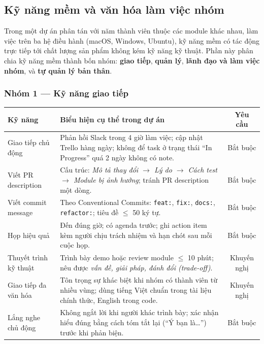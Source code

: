 \documentclass[12pt,a4paper]{article}
\begin{document}
\subsection{Kỹ năng mềm và văn hóa làm việc nhóm}

Trong một dự án phân tán với năm thành viên thuộc các module khác nhau, làm việc
trên ba hệ điều hành (macOS, Windows, Ubuntu), kỹ năng mềm có tác động trực tiếp
tới chất lượng sản phẩm không kém kỹ năng kỹ thuật. Phần này phân chia kỹ năng
mềm thành bốn nhóm: \textbf{giao tiếp}, \textbf{quản lý}, \textbf{lãnh đạo và
làm việc nhóm}, và \textbf{tự quản lý bản thân}.

\subsubsection{Nhóm 1 --- Kỹ năng giao tiếp}

\begin{tabularx}{\linewidth}{|l|X|c|}
\hline
\rowcolor{gray!20}
\textbf{Kỹ năng} & \textbf{Biểu hiện cụ thể trong dự án} & \textbf{Yêu cầu} \\
\hline
Giao tiếp chủ động & Phản hồi Slack trong 4 giờ làm việc; cập nhật Trello hàng ngày;
                     không để task ở trạng thái ``In Progress'' quá 2 ngày không có note. & Bắt buộc \\
\hline
Viết PR description & Cấu trúc: \textit{Mô tả thay đổi $\to$ Lý do $\to$ Cách test $\to$
                      Module bị ảnh hưởng}; tránh PR description một dòng. & Bắt buộc \\
\hline
Viết commit message & Theo Conventional Commits: \texttt{feat:}, \texttt{fix:},
                      \texttt{docs:}, \texttt{refactor:}; tiêu đề $\le$ 50 ký tự. & Bắt buộc \\
\hline
Họp hiệu quả & Đến đúng giờ; có agenda trước; ghi action item kèm người chịu trách
               nhiệm và hạn chót sau mỗi cuộc họp. & Bắt buộc \\
\hline
Thuyết trình kỹ thuật & Trình bày demo hoặc review module $\le$ 10 phút; nêu được
                        \textit{vấn đề, giải pháp, đánh đổi (trade-off)}. & Khuyến nghị \\
\hline
Giao tiếp đa văn hóa & Tôn trọng sự khác biệt khi nhóm có thành viên từ nhiều vùng;
                       dùng tiếng Việt chuẩn trong tài liệu chính thức, English trong code. & Khuyến nghị \\
\hline
Lắng nghe chủ động & Không ngắt lời khi người khác trình bày; xác nhận hiểu đúng bằng
                     cách tóm tắt lại (``Ý bạn là\ldots'') trước khi phản biện. & Bắt buộc \\
\hline
\end{tabularx}
\end{document}
